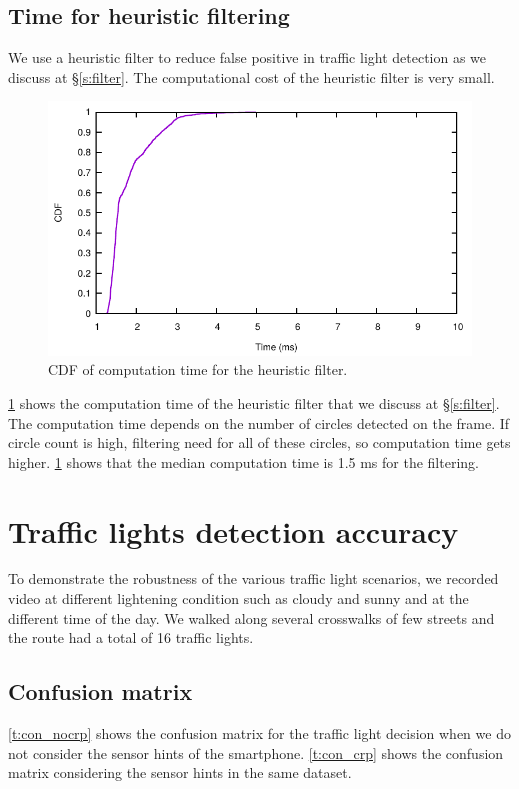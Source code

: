 \subsection{Time for heuristic filtering}
We use a heuristic filter to reduce false positive in traffic light detection as we discuss at \S\ref{s:filter}.
The computational cost of the heuristic filter is very small.

\begin{figure}[h!]
\centering
\includegraphics[width=5.2in]{plots/sunny_cdf_filter.pdf}
\caption{CDF of computation time for the heuristic filter.}
\label{f:cdf_fil}
\end{figure}

\ref{f:cdf_fil} shows the computation time of the heuristic filter that we discuss at \S\ref{s:filter}.
The computation time depends on the number of circles detected on the frame.
If circle count is high, filtering need for all of these circles, so computation time gets higher.
\ref{f:cdf_fil} shows that the median computation time is 1.5 ms for the filtering. 





\section{Traffic lights detection accuracy}
\label{s:acc}
To demonstrate the robustness of the various traffic light scenarios, we recorded video at different lightening condition such as cloudy and sunny and at the different time of the day.
We walked along several crosswalks of few streets and the route had a total of 16 traffic lights.

\subsection{Confusion matrix}
\ref{t:con_nocrp} shows the confusion matrix for the traffic light decision when we do not consider the sensor hints of the smartphone.
\ref{t:con_crp} shows the confusion matrix considering the sensor hints in the same dataset.

